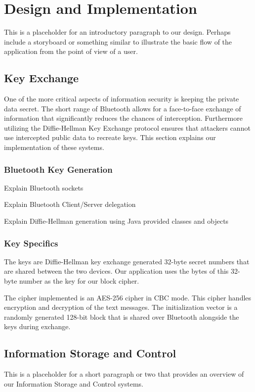 \section{Design and Implementation}
This is a placeholder for an introductory paragraph to our design. Perhaps include a storyboard or something similar to illustrate the basic flow of the application
from the point of view of a user.

\subsection{Key Exchange}
One of the more critical aspects of information security is keeping the private data secret.
The short range of Bluetooth allows for a face-to-face exchange of information that significantly
 reduces the chances of interception. Furthermore utilizing the Diffie-Hellman Key Exchange protocol
ensures that attackers cannot use intercepted public data to recreate keys. This section explains
our implementation of these systems.

\subsubsection{Bluetooth Key Generation}
Explain Bluetooth sockets

Explain Bluetooth Client/Server delegation

Explain Diffie-Hellman generation using Java provided classes and objects

\subsubsection{Key Specifics}
The keys are Diffie-Hellman key exchange generated 32-byte secret numbers that are shared between
the two devices. Our application uses the bytes of this 32-byte number as the key for our block cipher.

The cipher implemented is an AES-256 cipher in CBC mode. This cipher handles encryption and
decryption of the text messages. The initialization vector is a randomly generated 128-bit block that
is shared over Bluetooth alongside the keys during exchange.

\subsection{Information Storage and Control}
This is a placeholder for a short paragraph or two that provides an overview of our Information Storage and Control systems.

